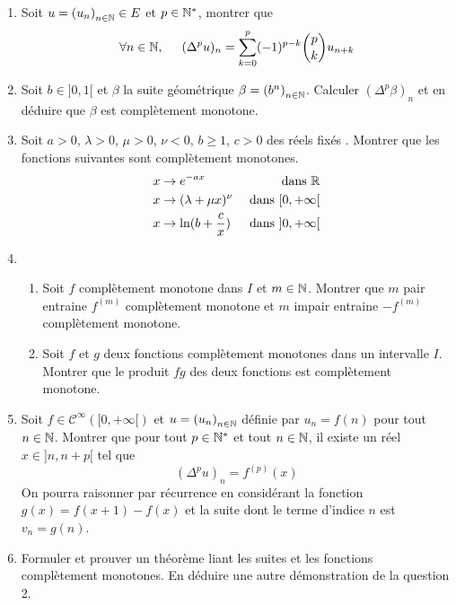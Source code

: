 \begin{enumerate}
  \item Soit $u= \left( u_n\right) _{n\in \mathbb{N}} \in E$ et $p\in \mathbb{N}^*$, montrer que
\begin{displaymath}
 \forall n\in \mathbb{N},\hspace{0.5cm}
(\Delta^p u)_n = 
\sum_{k=0}^p (-1)^{p-k}\binom{p}{k}u_{n+k}
\end{displaymath}

\item Soit $b\in ]0,1[$ et $\beta$ la suite géométrique $\beta= \left( b^n\right) _{n\in \mathbb{N}}$. Calculer $(\Delta ^p \beta)_n$ et en déduire que $\beta$ est complètement monotone. 

\item Soit $a>0$, $\lambda>0$, $\mu>0$, $\nu<0$, $b\geq 1$, $c>0$ des réels fixés . Montrer que les fonctions suivantes sont complètement monotones.
\begin{align*}
 &x\rightarrow e^{-a x} &\text{ dans } \mathbb{R} \\
 &x\rightarrow (\lambda + \mu x)^\nu &\text{ dans } [0,+\infty[ \\
 &x\rightarrow \ln(b+\frac{c}{x}) &\text{ dans }  ]0,+\infty[ 
\end{align*}

\item 
\begin{enumerate}
 \item Soit $f$ complètement monotone dans $I$ et $m\in \mathbb{N}$. Montrer que $m$ pair entraine $f^{(m)}$ complètement monotone et $m$ impair entraine $-f^{(m)}$ complètement monotone.
 \item Soit $f$ et $g$ deux fonctions complètement monotones dans un intervalle $I$. Montrer que le produit $fg$ des deux fonctions est complètement monotone. 
\end{enumerate}

\item Soit $f\in \mathcal{C}^\infty([0,+\infty[)$ et $u= \left( u_n\right) _{n\in \mathbb{N}}$ définie par $u_n=f(n)$ pour tout $n\in \mathbb{N}$. Montrer que pour tout $p\in \mathbb{N}^*$ et tout $n\in \mathbb{N}$, il existe un réel $x\in]n,n+p[$ tel que
\begin{displaymath}
 (\Delta^p u)_n = f^{(p)}(x)
\end{displaymath}
On pourra raisonner par récurrence en considérant la fonction $g(x)=f(x+1)-f(x)$ et la suite dont le terme d'indice $n$ est $v_n = g(n)$.
\item Formuler et prouver un théorème liant les suites et les fonctions complètement monotones. En déduire une autre démonstration de la question 2.
\end{enumerate}
